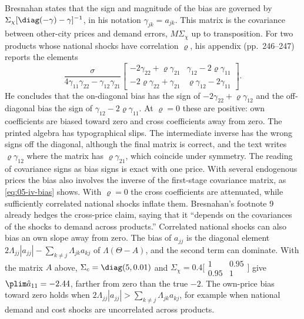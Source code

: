 Bresnahan states that the sign and magnitude of the bias are governed by $\Sigma_\chi[\diag(-\gamma) - \gamma]^{-1}$,
in his notation $\gamma_{jk} = a_{jk}$. This matrix is the covariance between other-city prices and demand
errors, $M\Sigma_\chi$ up to transposition. For two products whose national shocks have correlation $\varrho$, his
appendix (pp.~246--247) reports the elements
\begin{equation*}
  \frac{\sigma}{4\gamma_{11}\gamma_{22} - \gamma_{12}\gamma_{21}}
  \begin{bmatrix} -2\gamma_{22} + \varrho\gamma_{21} & \gamma_{12} - 2\varrho\gamma_{11}\\
  -2\varrho\gamma_{22} + \gamma_{21} & \varrho\gamma_{12} - 2\gamma_{11}\end{bmatrix}.
\end{equation*}
He concludes that the on-diagonal bias has the sign of
$-2\gamma_{22} + \varrho\gamma_{12}$ and the off-diagonal bias the sign of $\gamma_{12} - 2\varrho\gamma_{11}$. At
$\varrho = 0$ these are positive: own coefficients are biased toward zero and cross coefficients away from zero.
The printed algebra has typographical slips. The intermediate inverse has the wrong signs off the diagonal,
although the final matrix is correct, and the text writes $\varrho\gamma_{12}$ where the matrix has
$\varrho\gamma_{21}$, which coincide under symmetry. The reading of covariance signs as bias signs is exact with
one price. With several endogenous prices the bias also involves the inverse of the first-stage covariance
matrix, as \eqref{eq:05-iv-bias} shows. With $\varrho = 0$ the cross coefficients are attenuated, while
sufficiently correlated national shocks inflate them. Bresnahan's footnote 9 already hedges the cross-price
claim, saying that it ``depends on the covariances of the shocks to demand across products.'' Correlated
national shocks can also bias an own slope away from zero. The bias of $a_{jj}$ is the diagonal element
$2\Lambda_{jj}|a_{jj}| - \sum_{k\neq j}\Lambda_{jk}a_{kj}$ of $\Lambda(\Theta - A)$, and the second term can dominate.
With the matrix $A$ above, $\Sigma_c = \diag(5, 0.01)$ and
$\Sigma_\chi = 0.4\bigl[\begin{smallmatrix}1 & 0.95\\ 0.95 & 1\end{smallmatrix}\bigr]$ give
$\plim\hat a_{11} = -2.44$, farther from zero than the true $-2$. The own-price bias toward zero holds when
$2\Lambda_{jj}|a_{jj}| > \sum_{k\neq j}\Lambda_{jk}a_{kj}$, for example when national demand and cost shocks are
uncorrelated across products.

